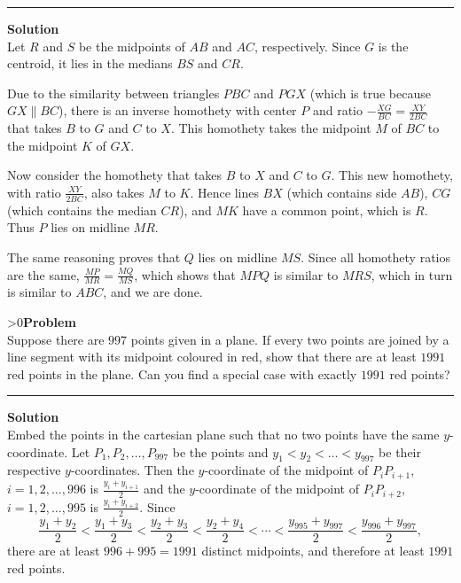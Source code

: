\documentclass[12pt,oneside,a4paper]{book}
\newcounter{probnum}
\newcounter{solnum}
\newcommand{\prob}{\ifnum\value{probnum}>0\newpage\fi\setcounter{solnum}{0}\stepcounter{probnum}\textbf{Problem \theprobnum}\\}
\newcommand{\sol}{\medskip\hrule\medbreak\textbf{Solution}\\}
\newcommand{\soln}{\stepcounter{solnum}\medskip\hrule\medbreak\textbf{Solution \thesolnum}\\}
\begin{document}
\soln
Let $R$ and $S$ be the midpoints of $AB$ and $AC$, respectively. Since $G$ is the centroid, it lies in the medians $BS$ and $CR$.
\begin{center}
\end{center}

Due to the similarity between triangles $PBC$ and $PGX$ (which is true because $GX\parallel BC$), there is an inverse homothety with center $P$ and ratio $-\frac{XG}{BC} = \frac{XY}{2BC}$ that takes $B$ to $G$ and $C$ to $X$. This homothety takes the midpoint $M$ of $BC$ to the midpoint $K$ of $GX$.

Now consider the homothety that takes $B$ to $X$ and $C$ to $G$. This new homothety, with ratio $\frac{XY}{2BC}$, also takes $M$ to $K$. Hence lines $BX$ (which contains side $AB$), $CG$ (which contains the median $CR$), and $MK$ have a common point, which is $R$. Thus $P$ lies on midline $MR$.

The same reasoning proves that $Q$ lies on midline $MS$. Since all homothety ratios are the same, $\frac{MP}{MR} = \frac{MQ}{MS}$, which shows that $MPQ$ is similar to $MRS$, which in turn is similar to $ABC$, and we are done.

\prob Suppose there are $997$ points given in a plane. If every two points are joined by a line segment with its midpoint coloured in red, show that there are at least $1991$ red points in the plane. Can you find a special case with exactly $1991$ red points?

\sol
Embed the points in the cartesian plane such that no two points have the same $y$-coordinate. Let $P_1,P_2,\ldots,P_{997}$ be the points and $y_1 < y_2 < \ldots < y_{997}$ be their respective $y$-coordinates. Then the $y$-coordinate of the midpoint of $P_iP_{i+1}$, $i=1,2,\ldots,996$ is $\frac{y_i+y_{i+1}}2$ and the $y$-coordinate of the midpoint of $P_iP_{i+2}$, $i=1,2,\ldots,995$ is $\frac{y_i+y_{i+2}}2$. Since
\[\frac{y_1+y_2}2 < \frac{y_1+y_3}2 < \frac{y_2+y_3}2 < \frac{y_2+y_4}2 < \cdots < \frac{y_{995}+y_{997}}2 < \frac{y_{996}+y_{997}}2,\]
there are at least $996+995=1991$ distinct midpoints, and therefore at least $1991$ red points.
\end{document}
